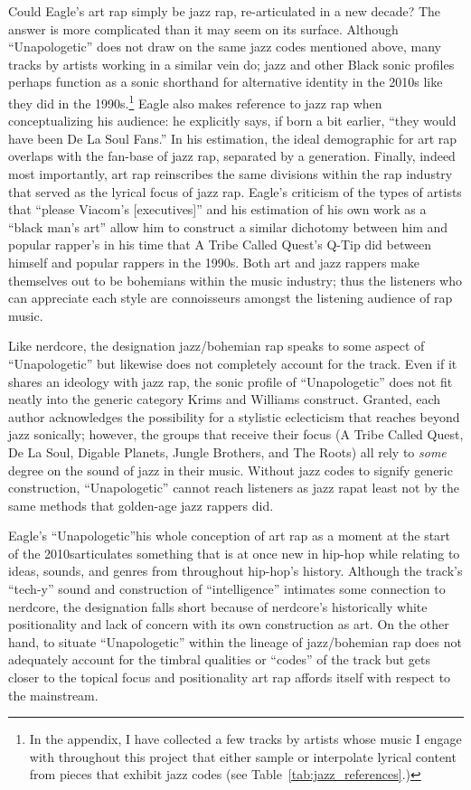 Could Eagle's art rap simply be jazz rap, re-articulated in a new decade? The answer is more complicated 
than it may seem on its surface. Although ``Unapologetic'' does not draw on the same jazz codes mentioned
above, many tracks by artists working in a similar vein do; jazz and other Black sonic profiles perhaps 
function as a sonic shorthand for alternative identity in the 2010s like they did in the 1990s.\footnote{
    In the appendix, I have collected a few tracks by artists whose music I engage with throughout 
    this project that either sample or interpolate lyrical content from pieces that exhibit jazz codes 
    (see Table~\ref{tab:jazz_references}.)}
Eagle also makes reference to jazz rap when conceptualizing his audience: he explicitly says, if born a 
bit earlier, ``they would have been De La Soul Fans.'' In his estimation, the ideal demographic for art 
rap overlaps with the fan-base of jazz rap, separated by a generation. Finally, indeed most importantly,
art rap reinscribes the same divisions within the rap industry that served as the lyrical focus of jazz 
rap. Eagle's criticism of the types of artists that ``please Viacom's [executives]'' and his  estimation
of his own work as a ``black man's art'' allow him to construct a similar dichotomy between him and popular
rapper's in his time that A Tribe Called Quest's Q-Tip did between himself and popular rappers in the 1990s.
Both art and jazz rappers make themselves out to be bohemians within the music industry; thus the listeners 
who can appreciate each style are connoisseurs amongst the listening audience of rap music.

Like nerdcore, the designation jazz/bohemian rap speaks to some aspect of ``Unapologetic'' but likewise does
not completely account for the track. Even if it shares an ideology with jazz rap, the sonic profile of 
``Unapologetic'' does not fit neatly into the generic category Krims and Williams construct. Granted, each 
author acknowledges the possibility for a stylistic eclecticism that reaches beyond jazz sonically; however,
the groups that receive their focus (A Tribe Called Quest, De La Soul, Digable Planets, Jungle Brothers, and
The Roots) all rely to \emph{some} degree on the sound of jazz in their music. Without jazz codes to signify
generic construction,  ``Unapologetic'' cannot reach listeners as jazz rap\textemdash at least not by the same
methods  that golden-age jazz rappers did.

Eagle's ``Unapologetic''\textemdash his whole conception of art rap as a moment at the start of the 
2010s\textemdash articulates something that is at once new in hip-hop while relating to ideas, sounds, and 
genres from throughout hip-hop's history. Although the track's ``tech-y'' sound and construction of 
``intelligence'' intimates some connection to nerdcore, the designation falls short because of nerdcore's 
historically white positionality and lack of concern with its own construction as art. On the other hand,
to situate ``Unapologetic'' within the lineage of jazz/bohemian rap does not adequately account for the 
timbral qualities or ``codes'' of the track but gets closer to the topical focus and positionality art
rap affords itself with respect to the mainstream.

